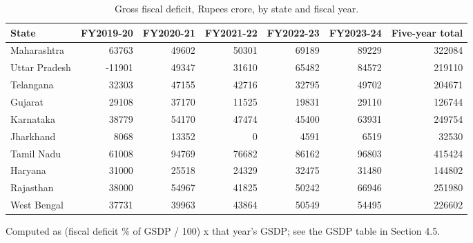\documentclass[12pt,a4paper]{article}
\begin{document}
\begin{table}[H]
\centering
\caption{Gross fiscal deficit, Rupees crore, by state and fiscal year.}
\label{tab:1}
\footnotesize
\begin{adjustbox}{max width=\textwidth}
\begin{tabular}{@{}lrrrrrr@{}}
\toprule
State & FY2019-20 & FY2020-21 & FY2021-22 & FY2022-23 & FY2023-24 & Five-year total \\
\midrule
Maharashtra & 63763 & 49602 & 50301 & 69189 & 89229 & 322084 \\
Uttar Pradesh & -11901 & 49347 & 31610 & 65482 & 84572 & 219110 \\
Telangana & 32303 & 47155 & 42716 & 32795 & 49702 & 204671 \\
Gujarat & 29108 & 37170 & 11525 & 19831 & 29110 & 126744 \\
Karnataka & 38779 & 54170 & 47474 & 45400 & 63931 & 249754 \\
Jharkhand & 8068 & 13352 & 0 & 4591 & 6519 & 32530 \\
Tamil Nadu & 61008 & 94769 & 76682 & 86162 & 96803 & 415424 \\
Haryana & 31000 & 25518 & 24329 & 32475 & 31480 & 144802 \\
Rajasthan & 38000 & 54967 & 41825 & 50242 & 66946 & 251980 \\
West Bengal & 37731 & 39963 & 43864 & 50549 & 54495 & 226602 \\
\bottomrule
\end{tabular}
\end{adjustbox}
\end{table}

Computed as (fiscal deficit \% of GSDP / 100) x that year's GSDP; see the GSDP table in Section 4.5.
\end{document}

